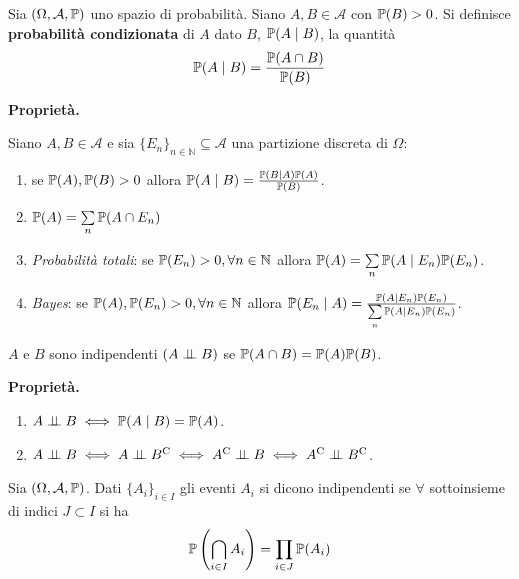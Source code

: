 
\ParteEsercizi


\begin{definition}
Sia $( \Omega ,\mathcal{A} ,\mathbb{P})$ uno spazio di probabilità. Siano $A,B\in \mathcal{A}$ con $\mathbb{P}( B)  >0$. Si definisce \textbf{probabilità condizionata} di $A$ dato $B$, $\mathbb{P}( A\mid B)$, la quantità
\begin{equation*}
\mathbb{P}( A\mid B) =\frac{\mathbb{P}( A\cap B)}{\mathbb{P}( B)}
\end{equation*}
\end{definition}
\textbf{Proprietà.}

Siano $A,B\in \mathcal{A}$ e sia $\{E_{n}\}_{n\in \mathbb{N}} \subseteq \mathcal{A}$ una partizione discreta di $\Omega $:
\begin{enumerate}
\item se $\mathbb{P}( A) ,\mathbb{P}( B)  >0$ allora $\mathbb{P}( A\mid B) =\frac{\mathbb{P}( B\mid A)\mathbb{P}( A)}{\mathbb{P}( B)}$.
\item $\mathbb{P}( A) =\sum\limits _{n}\mathbb{P}( A\cap E_{n})$
\item \textit{Probabilità totali}: se $\mathbb{P}( E_{n})  >0,\forall n\in \mathbb{N}$ allora $\mathbb{P}( A) =\sum\limits _{n}\mathbb{P}( A\mid E_{n})\mathbb{P}( E_{n})$.
\item \textit{Bayes}: se $\mathbb{P}( A) ,\mathbb{P}( E_{n})  >0,\forall n\in \mathbb{N}$ allora $\mathbb{P}( E_{n} \mid A) =\frac{\mathbb{P}( A\mid E_{n})\mathbb{P}( E_{n})}{\sum\limits _{n}\mathbb{P}( A\mid E_{n})\mathbb{P}( E_{n})}$.
\end{enumerate}
\begin{definition}
$A$ e $B$ sono indipendenti $( A\perp \!\!\! \perp B)$ se $\mathbb{P}( A\cap B) =\mathbb{P}( A)\mathbb{P}( B)$.
\end{definition}
\textbf{Proprietà.}
\begin{enumerate}
\item $A\perp \!\!\! \perp B\iff \mathbb{P}( A\mid B) =\mathbb{P}( A)$.
\item $A\indep B\iff A\indep B\complementary \iff A\complementary \indep B\iff A\complementary \indep B\complementary$.
\end{enumerate}
\begin{definition}
Sia $( \Omega ,\mathcal{A} ,\mathbb{P})$. Dati $\{A_{i}\}_{i\in I}$ gli eventi $A_{i}$ si dicono indipendenti se $\forall $ sottoinsieme di indici $J\subset I$ si ha
\begin{equation*}
\mathbb{P}\left(\bigcap _{i\in I} A_{i}\right) =\prod _{i\in J}\mathbb{P}( A_{i})
\end{equation*}
\end{definition}
\Esercizio{}

